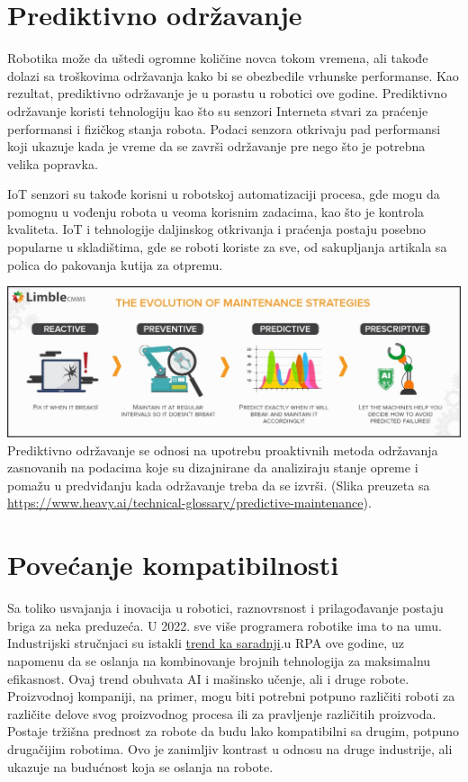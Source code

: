 \documentclass{report}
\begin{document}
\chapter{Prediktivno održavanje}
Robotika može da uštedi ogromne količine novca tokom vremena, ali takođe dolazi sa troškovima održavanja kako bi se obezbedile vrhunske performanse. Kao rezultat, prediktivno održavanje je u porastu u robotici ove godine. Prediktivno održavanje koristi tehnologiju kao što su senzori Interneta stvari za praćenje performansi i fizičkog stanja robota. Podaci senzora otkrivaju pad performansi koji ukazuje kada je vreme da se završi održavanje pre nego što je potrebna velika popravka.

IoT senzori su takođe korisni u robotskoj automatizaciji procesa, gde mogu da pomognu u vođenju robota u veoma korisnim zadacima, kao što je kontrola kvaliteta. IoT i tehnologije daljinskog otkrivanja i praćenja postaju posebno popularne u skladištima, gde se roboti koriste za sve, od sakupljanja artikala sa polica do pakovanja kutija za otpremu.
 \cite{robotic2022}


\centering
\vspace{2cm}
\includegraphics[scale=0.37]{dijagram.jpeg}
Prediktivno održavanje se odnosi na upotrebu proaktivnih metoda održavanja zasnovanih na podacima koje su dizajnirane da analiziraju stanje opreme i pomažu u predviđanju kada održavanje treba da se izvrši. (Slika preuzeta sa \url{https://www.heavy.ai/technical-glossary/predictive-maintenance}).

\chapter{Povećanje kompatibilnosti}
Sa toliko usvajanja i inovacija u robotici, raznovrsnost i prilagođavanje postaju briga za neka preduzeća. U 2022. sve više programera robotike ima to na umu. Industrijski stručnjaci su istakli
\href{https://enterprisersproject.com/article/2022/1/4-robotic-process-automation-rpa-trends-watch-2022}{trend ka saradnji}.u RPA ove godine, uz napomenu da se oslanja na kombinovanje brojnih tehnologija za maksimalnu efikasnost.
Ovaj trend obuhvata AI i mašinsko učenje, ali i druge robote. Proizvodnoj kompaniji, na primer, mogu biti potrebni potpuno različiti roboti za različite delove svog proizvodnog procesa ili za pravljenje različitih proizvoda. Postaje tržišna prednost za robote da budu lako kompatibilni sa drugim, potpuno drugačijim robotima. Ovo je zanimljiv kontrast u odnosu na druge industrije, ali ukazuje na budućnost koja se oslanja na robote.
 \cite{robot2022}
\end{document}
